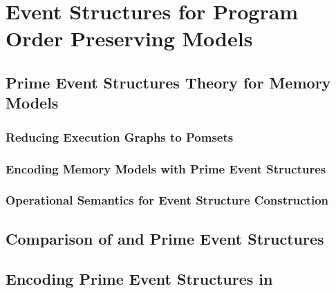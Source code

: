 \chapter{Event Structures for Program Order Preserving Models}
\label{ch:porf-evenstruct}

\section{Prime Event Structures Theory for Memory Models}
\label{sec:wmm-prime-es}

\subsection*{Reducing Execution Graphs to Pomsets}
\label{sec:pomset-graphs}
 
\subsection*{Encoding Memory Models with Prime Event Structures}
\label{sec:mm-eventstruct}

\subsection*{Operational Semantics for Event Structure Construction}
\label{sec:eventstruct-opsem}

\section{Comparison of \Wkm and Prime Event Structures}
\label{sec:eventstruct-cmp}

\section{Encoding Prime Event Structures in \coq}
\label{sec:coq-eventstruct}

